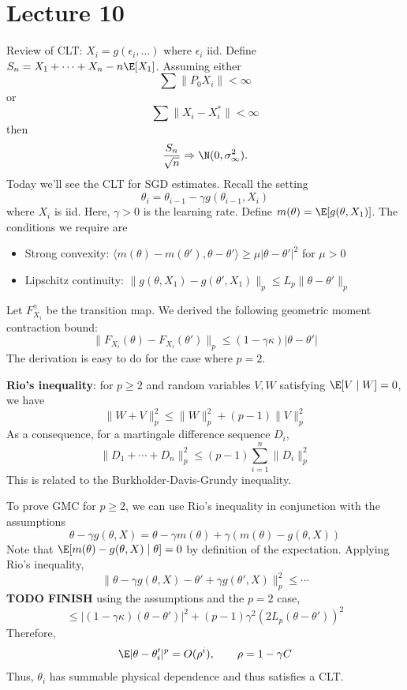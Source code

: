 \section{Lecture 10}

Review of CLT: \(X_i = g(\epsilon_i, \dots)\) where \(\epsilon_i\) iid. Define \(S_n = X_1 + \cdots + X_n - n \E[X_1]\). Assuming either
\[\sum \|P_0 X_i\| < \infty\]
or
\[\sum \|X_i - X_i^*\| < \infty\]
then
\[\frac{S_n}{\sqrt n} \Rightarrow \N(0, \sigma^2_\infty).\]
Today we'll see the CLT for SGD estimates. Recall the setting
\[\theta_i = \theta_{i-1} - \gamma g(\theta_{i-1}, X_i)\]
where \(X_i\) is iid. Here, \(\gamma > 0\) is the learning rate. Define \(m(\theta) = \E[g(\theta, X_1)]\). The conditions we require are

\begin{itemize}
\tightlist
\item
  Strong convexity: \(\langle m(\theta) - m(\theta'), \theta - \theta' \rangle \geq \mu |\theta - \theta'|^2\) for \(\mu > 0\)
\item
  Lipschitz continuity: \(\|g(\theta, X_1) - g(\theta', X_1)\|_p \leq L_p \|\theta - \theta'\|_p\)
\end{itemize}

Let \(F_{X_i}^\gamma\) be the transition map. We derived the following geometric moment contraction bound:
\[\|F_{X_i}(\theta) - F_{X_i}(\theta')\|_p \leq (1 - \gamma \kappa)|\theta - \theta'|\]
The derivation is easy to do for the case where \(p = 2\).

\textbf{Rio's inequality}: for \(p \geq 2\) and random variables \(V, W\) satisfying \(\E[V \mid W] = 0\), we have
\[\|W + V\|_p^2 \leq \|W\|_p^2 + (p - 1)\|V\|_p^2\]
As a consequence, for a martingale difference sequence \(D_i\),
\[\|D_1 + \cdots + D_n\|_p^2 \leq (p - 1)\sum_{i=1}^n \|D_i\|_p^2\]
This is related to the Burkholder-Davis-Grundy inequality.

To prove GMC for \(p \geq 2\), we can use Rio's inequality in conjunction with the assumptions
\[\theta - \gamma g(\theta, X) = \theta - \gamma m(\theta) + \gamma (m(\theta) - g(\theta, X))\]
Note that \(\E[m(\theta) - g(\theta, X) \mid \theta] = 0\) by definition of the expectation. Applying Rio's inequality,
\[\|\theta - \gamma g(\theta, X) - \theta' + \gamma g(\theta', X)\|_p^2 \leq \cdots\]
\textbf{TODO FINISH} using the assumptions and the \(p = 2\) case,
\[\leq |(1 - \gamma \kappa)(\theta - \theta')|^2 + (p - 1)\gamma^2(2L_p(\theta - \theta'))^2\]
Therefore,
\[\E|\theta - \theta_i'|^p = O(\rho^i), \qquad \rho = 1 - \gamma C\]
Thus, \(\theta_i\) has summable physical dependence and thus satisfies a CLT.

